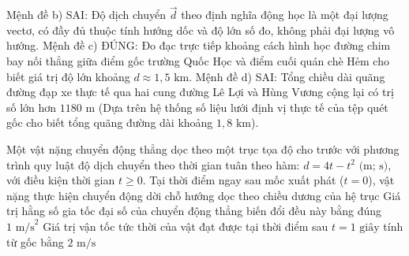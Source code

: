 \begin{ex}
{\begin{itemchoice}
				\itemch Mệnh đề b) SAI: Độ dịch chuyển $\vec{d}$ theo định nghĩa động học là một đại lượng vectơ, có đầy đủ thuộc tính hướng dốc và độ lớn số đo, không phải đại lượng vô hướng.
				\itemch Mệnh đề c) ĐÚNG: Đo đạc trực tiếp khoảng cách hình học đường chim bay nối thẳng giữa điểm gốc trường Quốc Học và điểm cuối quán chè Hẻm cho biết giá trị độ lớn khoảng $d \approx 1,5\text{ km}$.
				\itemch Mệnh đề d) SAI: Tổng chiều dài quãng đường đạp xe thực tế qua hai cung đường Lê Lợi và Hùng Vương cộng lại có trị số lớn hơn $1180\text{ m}$ (Dựa trên hệ thống số liệu lưới định vị thực tế của tệp quét gốc cho biết tổng quãng đường dài khoảng $1,8\text{ km}$).
			\end{itemchoice}
		}
	\end{ex}
	
	\begin{ex}%
		Một vật nặng chuyển động thẳng dọc theo một trục tọa độ cho trước với phương trình quy luật độ dịch chuyển theo thời gian tuân theo hàm: $d = 4t - t^2\text{ (m; s)}$, với điều kiện thời gian $t \ge 0$.
		{\True Tại thời điểm ngay sau mốc xuất phát ($t=0$), vật nặng thực hiện chuyển động dời chỗ hướng dọc theo chiều dương của hệ trục}
		{Giá trị hằng số gia tốc đại số của chuyển động thẳng biến đổi đều này bằng đúng $1\text{ m/s}^2$}
		{\True Giá trị vận tốc tức thời của vật đạt được tại thời điểm sau $t = 1\text{ giây}$ tính từ gốc bằng $2\text{ m/s}$}
	\end{ex}
	
